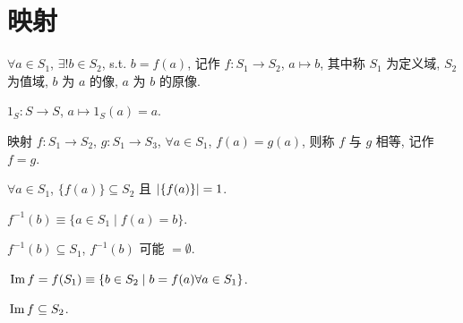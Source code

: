 \documentclass{note}
\begin{document}
\section{映射}
\begin{df}[映射]
    $\forall a\in S_1$, $\exists!b\in S_2$, s.t. $b=f(a)$, 记作 $f:S_1\rightarrow S_2$, $a\mapsto b$, 其中称 $S_1$ 为定义域, $S_2$ 为值域, $b$ 为 $a$ 的像, $a$ 为 $b$ 的原像.
\end{df}

\begin{eg}[恒等映射]
    $1_S:S\rightarrow S$, $a\mapsto 1_S(a)=a$.
\end{eg}

\begin{df}[映射相等]
    映射 $f:S_1\rightarrow S_2$, $g:S_1\rightarrow S_3$, $\forall a\in S_1$, $f(a)=g(a)$, 则称 $f$ 与 $g$ 相等, 记作 $f=g$.
\end{df}

$\forall a\in S_1$, $\{f(a)\}\subseteq S_2$ 且 $\left\lvert\{f(a)\}\right\rvert=1$.

\begin{df}[原像集]
    $f^{-1}(b)\equiv\{a\in S_1\mid f(a)=b\}$.
\end{df}

$f^{-1}(b)\subseteq S_1$, $f^{-1}(b)$ 可能 $=\emptyset$.

\begin{df}[像集]
    $\,\mathrm{Im}\, f=f(S_1)\equiv\{b\in S_2\mid b=f(a)\forall a\in S_1\}$.
\end{df}

$\,\mathrm{Im}\, f\subseteq S_2$.
\end{document}
